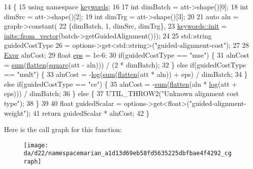 \begin{DoxyCode}
14                                    \{
15   \textcolor{keyword}{using namespace }\hyperlink{namespacekeywords}{keywords};
16 
17   \textcolor{keywordtype}{int} dimBatch = att->shape()[0];
18   \textcolor{keywordtype}{int} dimSrc = att->shape()[2];
19   \textcolor{keywordtype}{int} dimTrg = att->shape()[3];
20 
21   \textcolor{keyword}{auto} aln = graph->constant(
22       \{dimBatch, 1, dimSrc, dimTrg\},
23       \hyperlink{amunmt_8cpp_a2e8ddb8bd2f3405f554c9f2c52277f4b}{keywords::init} = \hyperlink{namespacemarian_1_1inits_ab9566318ddbacd376c74cdbdfac091e4}{inits::from\_vector}(batch->getGuidedAlignment()));
24 
25   std::string guidedCostType
26       = options->get<std::string>(\textcolor{stringliteral}{"guided-alignment-cost"});
27 
28   \hyperlink{namespacemarian_a498d8baf75b754011078b890b39c8e12}{Expr} alnCost;
29   \textcolor{keywordtype}{float} \hyperlink{namespacemarian_1_1keywords_a94a12c2471667d9574d8b013796ec1cc}{eps} = 1e-6;
30   \textcolor{keywordflow}{if}(guidedCostType == \textcolor{stringliteral}{"mse"}) \{
31     alnCost = \hyperlink{namespacemarian_a460460a6de63beebc5d968b44d49d11b}{sum}(\hyperlink{namespacemarian_aea8d2acadf0d96f6e455addd57cba80d}{flatten}(\hyperlink{namespacemarian_a953e6df1fb209a142e066a2546d88c8a}{square}(att - aln))) / (2 * dimBatch);
32   \} \textcolor{keywordflow}{else} \textcolor{keywordflow}{if}(guidedCostType == \textcolor{stringliteral}{"mult"}) \{
33     alnCost = -\hyperlink{namespacemarian_a0f3132fbaaaf9a5f2c1cbf6e3ad8f5f5}{log}(\hyperlink{namespacemarian_a460460a6de63beebc5d968b44d49d11b}{sum}(\hyperlink{namespacemarian_aea8d2acadf0d96f6e455addd57cba80d}{flatten}(att * aln)) + eps) / dimBatch;
34   \} \textcolor{keywordflow}{else} \textcolor{keywordflow}{if}(guidedCostType == \textcolor{stringliteral}{"ce"}) \{
35     alnCost = -\hyperlink{namespacemarian_a460460a6de63beebc5d968b44d49d11b}{sum}(\hyperlink{namespacemarian_aea8d2acadf0d96f6e455addd57cba80d}{flatten}(aln * \hyperlink{namespacemarian_a0f3132fbaaaf9a5f2c1cbf6e3ad8f5f5}{log}(att + eps))) / dimBatch;
36   \} \textcolor{keywordflow}{else} \{
37     UTIL\_THROW2(\textcolor{stringliteral}{"Unknown alignment cost type"});
38   \}
39 
40   \textcolor{keywordtype}{float} guidedScalar = options->get<\textcolor{keywordtype}{float}>(\textcolor{stringliteral}{"guided-alignment-weight"});
41   \textcolor{keywordflow}{return} guidedScalar * alnCost;
42 \}
\end{DoxyCode}


Here is the call graph for this function\+:
\nopagebreak
\begin{figure}[H]
\begin{center}
\leavevmode
\texttt{[image: da/d22/namespacemarian\_a1d13d69eb58fd5635225dbfbae4f4292\_cgraph]}
\end{center}
\end{figure}




